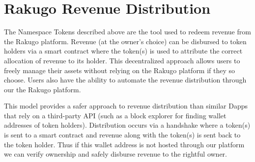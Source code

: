 \documentclass{article}
\begin{document}
\section{Rakugo Revenue Distribution}

The Namespace Tokens described above are the tool used to redeem revenue from the Rakugo platform. Revenue (at the owner's choice) can be disbursed to token holders via a smart contract where the token(s) is used to attribute the correct allocation of revenue to its holder. This decentralized approach allows users to freely manage their assets without relying on the Rakugo platform if they so choose. Users also have the ability to automate the revenue distribution through our the Rakugo platform.

This model provides a safer approach to revenue distribution than similar Dapps that rely on a third-party API (such as a block explorer for finding wallet addresses of token holders). Distribution occurs via a handshake where a token(s) is sent to a smart contract and revenue along with the token(s) is sent back to the token holder. Thus if this wallet address is not hosted through our platform we can verify ownership and safely disburse revenue to the rightful owner.
\end{document}
